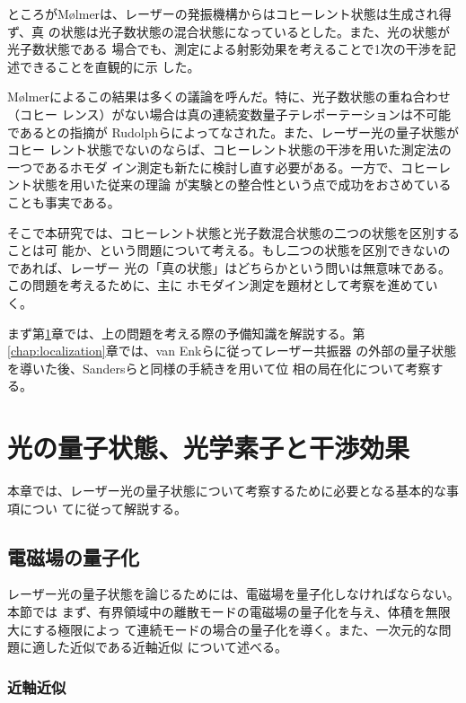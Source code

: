 \documentclass[10pt]{jsarticle}
\begin{document}
ところがM{\o}lmerは、レーザーの発振機構からはコヒーレント状態は生成され得ず、真
の状態は光子数状態の混合状態になっているとした。また、光の状態が光子数状態である
場合でも、測定による射影効果を考えることで1次の干渉を記述できることを直観的に示
した\cite{Molmer1997}。

M{\o}lmerによるこの結果は多くの議論を呼んだ。特に、光子数状態の重ね合わせ（コヒー
レンス）がない場合は真の連続変数量子テレポーテーションは不可能であるとの指摘が
Rudolphらによってなされた\cite{Rudolph2001}。また、レーザー光の量子状態がコヒー
レント状態でないのならば、コヒーレント状態の干渉を用いた測定法の一つであるホモダ
イン測定も新たに検討し直す必要がある。一方で、コヒーレント状態を用いた従来の理論
が実験との整合性という点で成功をおさめていることも事実である。

そこで本研究では、コヒーレント状態と光子数混合状態の二つの状態を区別することは可
能か、という問題について考える。もし二つの状態を区別できないのであれば、レーザー
光の「真の状態」はどちらかという問いは無意味である。この問題を考えるために、主に
ホモダイン測定を題材として考察を進めていく。

まず第\ref{chap:preparation}章では、上の問題を考える際の予備知識を解説する。第
\ref{chap:localization}章では、van Enkら\cite{vanEnk2002}に従ってレーザー共振器
の外部の量子状態を導いた後、Sandersら\cite{Sanders2003}と同様の手続きを用いて位
相の局在化について考察する。

\section{光の量子状態、光学素子と干渉効果}
\label{chap:preparation}

本章では、レーザー光の量子状態について考察するために必要となる基本的な事項につい
て\cite{Matsuoka,Leonhardt,Vogel}に従って解説する。

\subsection{電磁場の量子化}

レーザー光の量子状態を論じるためには、電磁場を量子化しなければならない。本節では
まず、有界領域中の離散モードの電磁場の量子化を与え、体積を無限大にする極限によっ
て連続モードの場合の量子化を導く。また、一次元的な問題に適した近似である近軸近似
について述べる。

\subsubsection*{近軸近似}
\label{sec:paraxial}
\end{document}
